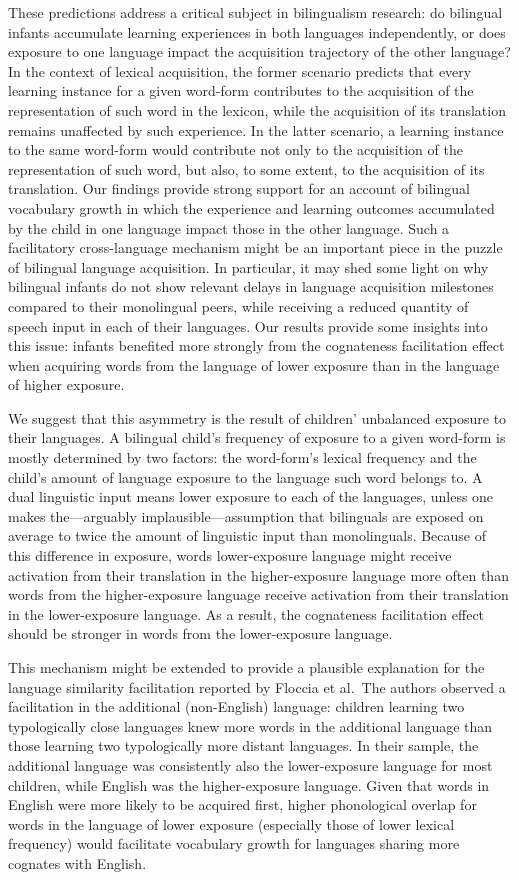 \documentclass[
]{article}
\begin{document}
These predictions address a critical subject in bilingualism research:
do bilingual infants accumulate learning experiences in both languages
independently, or does exposure to one language impact the acquisition
trajectory of the other language? In the context of lexical acquisition,
the former scenario predicts that every learning instance for a given
word-form contributes to the acquisition of the representation of such
word in the lexicon, while the acquisition of its translation remains
unaffected by such experience. In the latter scenario, a learning
instance to the same word-form would contribute not only to the
acquisition of the representation of such word, but also, to some
extent, to the acquisition of its translation. Our findings provide
strong support for an account of bilingual vocabulary growth in which
the experience and learning outcomes accumulated by the child in one
language impact those in the other language. Such a facilitatory
cross-language mechanism might be an important piece in the puzzle of
bilingual language acquisition. In particular, it may shed some light on
why bilingual infants do not show relevant delays in language
acquisition milestones compared to their monolingual peers, while
receiving a reduced quantity of speech input in each of their languages.
Our results provide some insights into this issue: infants benefited
more strongly from the cognateness facilitation effect when acquiring
words from the language of lower exposure than in the language of higher
exposure.

We suggest that this asymmetry is the result of children' unbalanced
exposure to their languages. A bilingual child's frequency of exposure
to a given word-form is mostly determined by two factors: the
word-form's lexical frequency and the child's amount of language
exposure to the language such word belongs to. A dual linguistic input
means lower exposure to each of the languages, unless one makes
the---arguably implausible---assumption that bilinguals are exposed on
average to twice the amount of linguistic input than monolinguals.
Because of this difference in exposure, words lower-exposure language
might receive activation from their translation in the higher-exposure
language more often than words from the higher-exposure language receive
activation from their translation in the lower-exposure language. As a
result, the cognateness facilitation effect should be stronger in words
from the lower-exposure language.

This mechanism might be extended to provide a plausible explanation for
the language similarity facilitation reported by Floccia et al.~The
authors observed a facilitation in the additional (non-English)
language: children learning two typologically close languages knew more
words in the additional language than those learning two typologically
more distant languages. In their sample, the additional language was
consistently also the lower-exposure language for most children, while
English was the higher-exposure language. Given that words in English
were more likely to be acquired first, higher phonological overlap for
words in the language of lower exposure (especially those of lower
lexical frequency) would facilitate vocabulary growth for languages
sharing more cognates with English.
\end{document}
